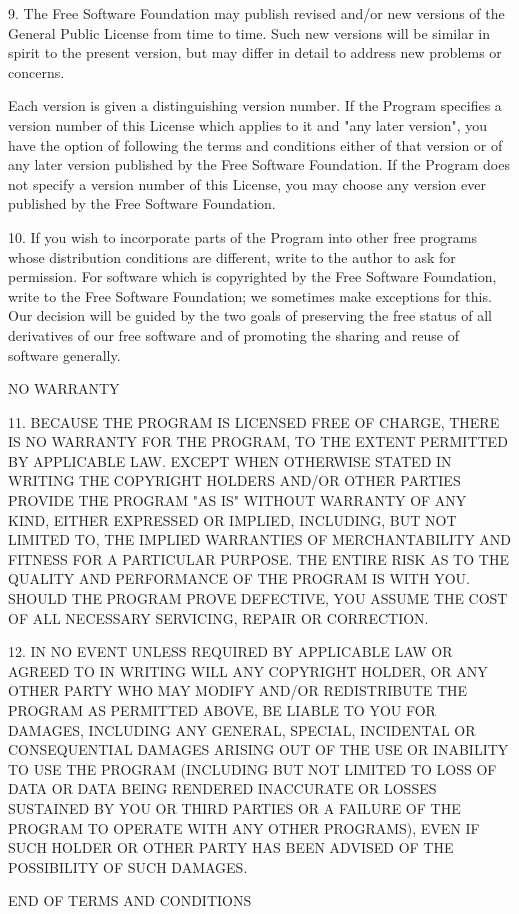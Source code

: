 \begin{DoxyCode}
  9. The Free Software Foundation may publish revised and/or new versions
of the General Public License from time to time.  Such new versions will
be similar in spirit to the present version, but may differ in detail to
address new problems or concerns.

Each version is given a distinguishing version number.  If the Program
specifies a version number of this License which applies to it and "any
later version", you have the option of following the terms and conditions
either of that version or of any later version published by the Free
Software Foundation.  If the Program does not specify a version number of
this License, you may choose any version ever published by the Free Software
Foundation.

  10. If you wish to incorporate parts of the Program into other free
programs whose distribution conditions are different, write to the author
to ask for permission.  For software which is copyrighted by the Free
Software Foundation, write to the Free Software Foundation; we sometimes
make exceptions for this.  Our decision will be guided by the two goals
of preserving the free status of all derivatives of our free software and
of promoting the sharing and reuse of software generally.

NO WARRANTY

  11. BECAUSE THE PROGRAM IS LICENSED FREE OF CHARGE, THERE IS NO WARRANTY
FOR THE PROGRAM, TO THE EXTENT PERMITTED BY APPLICABLE LAW.  EXCEPT WHEN
OTHERWISE STATED IN WRITING THE COPYRIGHT HOLDERS AND/OR OTHER PARTIES
PROVIDE THE PROGRAM "AS IS" WITHOUT WARRANTY OF ANY KIND, EITHER EXPRESSED
OR IMPLIED, INCLUDING, BUT NOT LIMITED TO, THE IMPLIED WARRANTIES OF
MERCHANTABILITY AND FITNESS FOR A PARTICULAR PURPOSE.  THE ENTIRE RISK AS
TO THE QUALITY AND PERFORMANCE OF THE PROGRAM IS WITH YOU.  SHOULD THE
PROGRAM PROVE DEFECTIVE, YOU ASSUME THE COST OF ALL NECESSARY SERVICING,
REPAIR OR CORRECTION.

  12. IN NO EVENT UNLESS REQUIRED BY APPLICABLE LAW OR AGREED TO IN WRITING
WILL ANY COPYRIGHT HOLDER, OR ANY OTHER PARTY WHO MAY MODIFY AND/OR
REDISTRIBUTE THE PROGRAM AS PERMITTED ABOVE, BE LIABLE TO YOU FOR DAMAGES,
INCLUDING ANY GENERAL, SPECIAL, INCIDENTAL OR CONSEQUENTIAL DAMAGES ARISING
OUT OF THE USE OR INABILITY TO USE THE PROGRAM (INCLUDING BUT NOT LIMITED
TO LOSS OF DATA OR DATA BEING RENDERED INACCURATE OR LOSSES SUSTAINED BY
YOU OR THIRD PARTIES OR A FAILURE OF THE PROGRAM TO OPERATE WITH ANY OTHER
PROGRAMS), EVEN IF SUCH HOLDER OR OTHER PARTY HAS BEEN ADVISED OF THE
POSSIBILITY OF SUCH DAMAGES.

END OF TERMS AND CONDITIONS
\end{DoxyCode}



